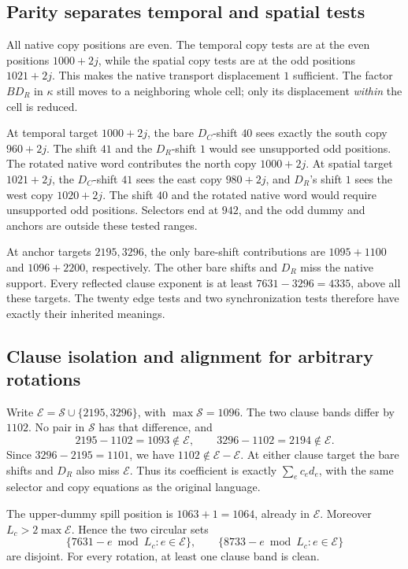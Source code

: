 \subsection{Parity separates temporal and spatial tests}

All native copy positions are even. The temporal copy tests are
at the even positions \(1000+2j\), while the spatial copy tests
are at the odd positions \(1021+2j\).
This makes the native transport displacement \(1\) sufficient.
The factor \(BD_R\) in \(\kappa\) still moves to a neighboring
whole cell; only its displacement \emph{within} the cell is reduced.

At temporal target \(1000+2j\), the bare \(D_C\)-shift \(40\)
sees exactly the south copy \(960+2j\). The shift \(41\)
and the \(D_R\)-shift \(1\) would see unsupported odd positions.
The rotated native word contributes the north copy \(1000+2j\).
At spatial target \(1021+2j\), the \(D_C\)-shift \(41\)
sees the east copy \(980+2j\), and \(D_R\)'s shift \(1\)
sees the west copy \(1020+2j\). The shift \(40\) and the
rotated native word would require unsupported odd positions.
Selectors end at \(942\), and the odd dummy and anchors are
outside these tested ranges.

At anchor targets \(2195,3296\), the only bare-shift contributions
are \(1095+1100\) and \(1096+2200\), respectively.
The other bare shifts and \(D_R\) miss the native support.
Every reflected clause exponent is at least
\(7631-3296=4335\), above all these targets.
The twenty edge tests and two synchronization tests therefore
have exactly their inherited meanings.

\subsection{Clause isolation and alignment for arbitrary rotations}

Write \(\mathcal E=\mathcal S\cup\{2195,3296\}\), with
\(\max\mathcal S=1096\). The two clause bands differ by \(1102\).
No pair in \(\mathcal S\) has that difference, and
\[
2195-1102=1093\notin\mathcal E,\qquad
3296-1102=2194\notin\mathcal E.
\]
Since \(3296-2195=1101\), we have
\(1102\notin\mathcal E-\mathcal E\).
At either clause target the bare shifts and \(D_R\) also miss
\(\mathcal E\). Thus its coefficient is exactly
\(\sum_e c_e d_e\), with the same selector and copy equations
as the original language.

The upper-dummy spill position is \(1063+1=1064\), already in
\(\mathcal E\). Moreover \(L_c>2\max\mathcal E\).
Hence the two circular sets
\[
\{7631-e\bmod L_c:e\in\mathcal E\},
\qquad
\{8733-e\bmod L_c:e\in\mathcal E\}
\]
are disjoint. For every rotation, at least one clause band is clean.


